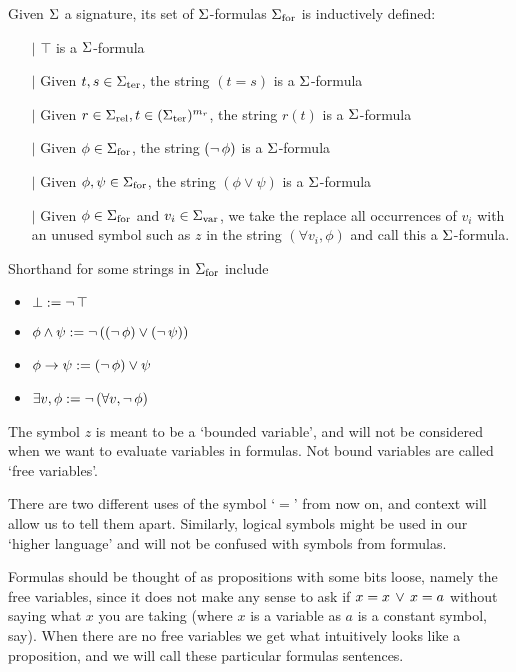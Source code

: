 \begin{dfn}
    Given $\Sigma$ a signature, 
    its set of $\Sigma$-formulas ${\Sigma}_\mathrm{for}$ is inductively defined:
    \begin{itemize}
        \item[$\vert$] $\top$ is a $\Sigma$-formula
        \item[$\vert$] Given $t, s \in {\Sigma}_\mathrm{ter}$, 
        the string $(t = s)$ is a $\Sigma$-formula
        \item[$\vert$] Given $r \in {\Sigma}_\mathrm{rel}, t \in ({\Sigma}_\mathrm{ter})^{m_r}$, 
        the string $r(t)$ is a $\Sigma$-formula \vspace{1em}
        \item[$\vert$] Given $\phi \in {\Sigma}_\mathrm{for}$, 
        the string $(\neg\, \phi)$ is a $\Sigma$-formula 
        \item[$\vert$] Given $\phi, \psi \in {\Sigma}_\mathrm{for}$, the string 
        $(\phi \lor \psi)$ is a $\Sigma$-formula
        \item[$\vert$] Given $\phi \in {\Sigma}_\mathrm{for}$ 
        and $v_i \in {\Sigma}_\mathrm{var}$, we take the replace all occurrences of
        $v_i$ with an unused symbol such as 
        $z$ in the string $(\forall v_i, \phi)$
        and call this a $\Sigma$-formula.
    \end{itemize}
    Shorthand for some strings in ${\Sigma}_\mathrm{for}$ include 
    \begin{itemize}
        \item $\bot := \neg\, \top$
        \item $\phi \land \psi := \neg\,((\neg\,\phi) \lor (\neg\,\psi))$
        \item $\phi \to \psi := (\neg\,\phi) \lor \psi$
        \item $\exists v, \phi := \neg\,(\forall v, \neg\,\phi)$
    \end{itemize}
    
    The symbol $z$ is meant to be a `bounded variable', 
    and will not be considered when we want to evaluate
    variables in formulas.
    Not bound variables are called `free variables'.
\end{dfn}
\begin{rmk}
    There are two different uses of the symbol `$=$' from now on, 
    and context will allow us to tell them apart.
    Similarly, logical symbols might be used in our `higher language' 
    and will not be confused with symbols from formulas.

    Formulas should be thought of as propositions with some bits loose, 
    namely the free variables, since it does not make any sense to ask if 
    $x = x \, \lor \, x = a$ without saying what $x$ you are taking
    (where $x$ is a variable as $a$ is a constant symbol, say).
    When there are no free variables we get what intuitively looks like a 
    proposition, and we will call these particular formulas sentences.
\end{rmk}

